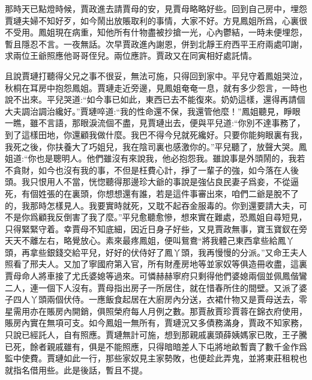 \begin{parag}
    那時天已點燈時候，賈政進去請賈母的安，見賈母略略好些。回到自己房中，埋怨賈璉夫婦不知好歹，如今鬧出放賬取利的事情，大家不好。方見鳳姐所爲，心裏很不受用。鳳姐現在病重，知他所有什物盡被抄搶一光，心內鬱結，一時未便埋怨，暫且隱忍不言。一夜無話。次早賈政進內謝恩，併到北靜王府西平王府兩處叩謝，求兩位王爺照應他哥哥侄兒。兩位應許。賈政又在同寅相好處託情。
\end{parag}


\begin{parag}
    且說賈璉打聽得父兄之事不很妥，無法可施，只得回到家中。平兒守着鳳姐哭泣，秋桐在耳房中抱怨鳳姐。賈璉走近旁邊，見鳳姐奄奄一息，就有多少怨言，一時也說不出來。平兒哭道:“如今事已如此，東西已去不能復來。奶奶這樣，還得再請個大夫調治調治纔好。”賈璉啐道:“我的性命還不保，我還管他麼！”鳳姐聽見，睜眼一瞧，雖不言語，那眼淚流個不盡，見賈璉出去，便與平兒道:“你別不達事務了，到了這樣田地，你還顧我做什麼。我巴不得今兒就死纔好。只要你能夠眼裏有我，我死之後，你扶養大了巧姐兒，我在陰司裏也感激你的。”平兒聽了，放聲大哭。鳳姐道:“你也是聰明人。他們雖沒有來說我，他必抱怨我。雖說事是外頭鬧的，我若不貪財，如今也沒有我的事，不但是枉費心計，掙了一輩子的強，如今落在人後頭。我只恨用人不當，恍惚聽得那邊珍大爺的事說是強佔良民妻子爲妾，不從逼死，有個姓張的在裏頭，你想想還有誰，若是這件事審出來，咱們二爺是脫不了的，我那時怎樣見人。我要實時就死，又耽不起吞金服毒的。你到還要請大夫，可不是你爲顧我反倒害了我了麼。”平兒愈聽愈慘，想來實在難處，恐鳳姐自尋短見，只得緊緊守着。幸賈母不知底細，因近日身子好些，又見賈政無事，寶玉寶釵在旁天天不離左右，略覺放心。素來最疼鳳姐，便叫鴛鴦“將我體己東西拿些給鳳丫頭，再拿些銀錢交給平兒，好好的伏侍好了鳳丫頭，我再慢慢的分派。”又命王夫人照看了邢夫人。又加了寧國府第入官，所有財產房地等並家奴等俱造冊收盡，這裏賈母命人將車接了尤氏婆媳等過來。可憐赫赫寧府只剩得他們婆媳兩個並佩鳳偕鸞二人，連一個下人沒有。賈母指出房子一所居住，就在惜春所住的間壁。又派了婆子四人丫頭兩個伏侍。一應飯食起居在大廚房內分送，衣裙什物又是賈母送去，零星需用亦在賬房內開銷，俱照榮府每人月例之數。那賈赦賈珍賈蓉在錦衣府使用，賬房內實在無項可支。如今鳳姐一無所有，賈璉況又多債務滿身，賈政不知家務，只說已經託人，自有照應。賈璉無計可施，想到那親戚裏頭薛姨媽家已敗，王子騰已死，餘者親戚雖有，俱是不能照應，只得暗暗差人下屯將地畝暫賣了數千金作爲監中使費。賈璉如此一行，那些家奴見主家勢敗，也便趁此弄鬼，並將東莊租稅也就指名借用些。此是後話，暫且不提。
\end{parag}


